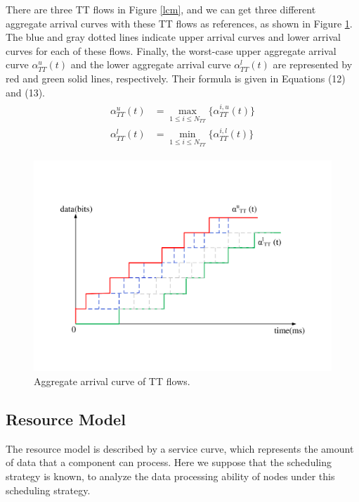 \documentclass[electronics,article,accept,moreauthors,pdftex]{Definitions/mdpi}
\begin{document}
There are three TT flows in {Figure} \ref{lcm}, and we can get three different aggregate arrival curves with these TT flows as references, as shown in {Figure} \ref{arr}. The blue and gray dotted lines indicate upper arrival curves and lower arrival curves for each of these flows. Finally, the worst-case upper aggregate arrival curve $\alpha_{TT}^u(t)$ and the lower aggregate arrival curve $\alpha_{TT}^l(t)$ are represented by red and green solid lines, respectively. Their formula is given in Equations (12) and (13).
\begin{gather}
\begin{align}
	\alpha_{TT}^u(t) &= \max_{1 \leq i \leq {N_{TT}}} \{  \alpha_{TT}^{i,u}(t) \}\\
	\alpha_{TT}^l(t) &= \min_{1 \leq i \leq {N_{TT}}} \{  \alpha_{TT}^{i,l}(t) \}
\end{align}
\end{gather}

\begin{figure}[H]
\centering
\includegraphics[scale=0.35] {figures/arrival}
\caption{Aggregate arrival curve of TT flows.}
\label{arr}
\end{figure}
\subsection{Resource Model}

The resource model is described by a service curve, which represents the amount of data that a component can process. Here we suppose that the scheduling strategy is known, to analyze the data processing ability of nodes under this scheduling strategy.
\end{document}
